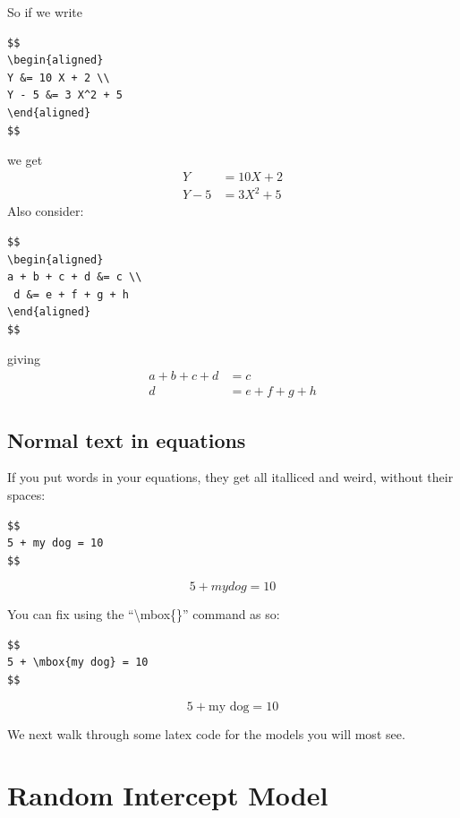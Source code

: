\documentclass[
  letterpaper,
  DIV=11,
  numbers=noendperiod]{scrreprt}
\begin{document}
So if we write

\begin{verbatim}
$$
\begin{aligned}
Y &= 10 X + 2 \\
Y - 5 &= 3 X^2 + 5
\end{aligned}
$$
\end{verbatim}

we get \[
\begin{aligned}
Y &= 10 X + 2 \\
Y - 5 &= 3 X^2 + 5
\end{aligned}
\] Also consider:

\begin{verbatim}
$$
\begin{aligned}
a + b + c + d &= c \\
 d &= e + f + g + h 
\end{aligned}
$$
\end{verbatim}

giving \[
\begin{aligned}
a + b + c + d &= c \\
 d &= e + f + g + h 
\end{aligned}
\]

\hypertarget{normal-text-in-equations}{%
\subsection{Normal text in equations}\label{normal-text-in-equations}}

If you put words in your equations, they get all italliced and weird,
without their spaces:

\begin{verbatim}
$$
5 + my dog = 10
$$
\end{verbatim}

\[
5 + my dog = 10
\]

You can fix using the ``\textbackslash mbox\{\}'' command as so:

\begin{verbatim}
$$
5 + \mbox{my dog} = 10
$$
\end{verbatim}

\[
5 + \mbox{my dog} = 10
\]

We next walk through some latex code for the models you will most see.

\hypertarget{random-intercept-model}{%
\section{Random Intercept Model}\label{random-intercept-model}}
\end{document}
